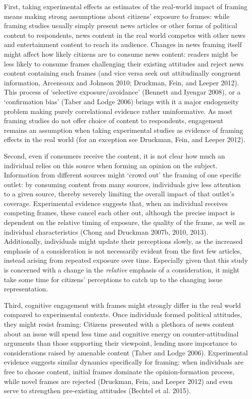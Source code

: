 \documentclass[
  12pt,
]{article}
\begin{document}
First, taking experimental effects as estimates of the real-world impact of framing means making strong assumptions about citizens' exposure to frames: while framing studies usually simply present news articles or other forms of political content to respondents, news content in the real world competes with other news and entertainment content to reach its audience. Changes in news framing itself might affect how likely citizens are to consume news content: readers might be less likely to consume frames challenging their existing attitudes and reject news content containing such frames (and vice versa seek out attitudinally congruent information, Arceneaux and Johnson 2010; Druckman, Fein, and Leeper 2012). This process of `selective exposure/avoidance' (Bennett and Iyengar 2008), or a `confirmation bias' (Taber and Lodge 2006) brings with it a major endogeneity problem making purely correlational evidence rather uninformative. As most framing studies do not offer choice of content to respondents, engagement remains an assumption when taking experimental studies as evidence of framing effects in the real world (for an exception see Druckman, Fein, and Leeper 2012).

Second, even if consumers receive the content, it is not clear how much an individual relies on this source when forming an opinion on the subject. Information from different sources might `crowd out' the framing of one specific outlet: by consuming content from many sources, individuals give less attention to a given source, thereby severely limiting the overall impact of that outlet's coverage. Experimental evidence suggests that, when an individual receives competing frames, these cancel each other out, although the precise impact is dependent on the relative timing of exposure, the quality of the frame, as well as individual characteristics (Chong and Druckman 2007b, 2010, 2013). Additionally, individuals might update their perceptions slowly, as the increased emphasis of a consideration is not necessarily evident from the first few articles, instead arising from repeated exposure over time. Especially given that this study is concerned with a change in the \emph{relative} emphasis of a consideration, it might take some time for citizens' perceptions to catch up to the changing issue representation.

Third, cognitive engagement with frames might strongly differ in the real world compared to experimental contexts. Once individuals formed political attitudes, they might resist framing: Citizens presented with a plethora of news content about an issue will spend less time and cognitive energy on counter-attitudinal arguments than those supporting their viewpoint, lending more importance to considerations raised by amenable content (Taber and Lodge 2006). Experimental evidence suggests similar dynamics specifically for framing: when individuals are free to choose content, initial frames dominate the opinion-formation process, while novel frames are rejected (Druckman, Fein, and Leeper 2012) and even serve to strengthen pre-existing attitudes (Bechtel et al. 2015).
\end{document}
